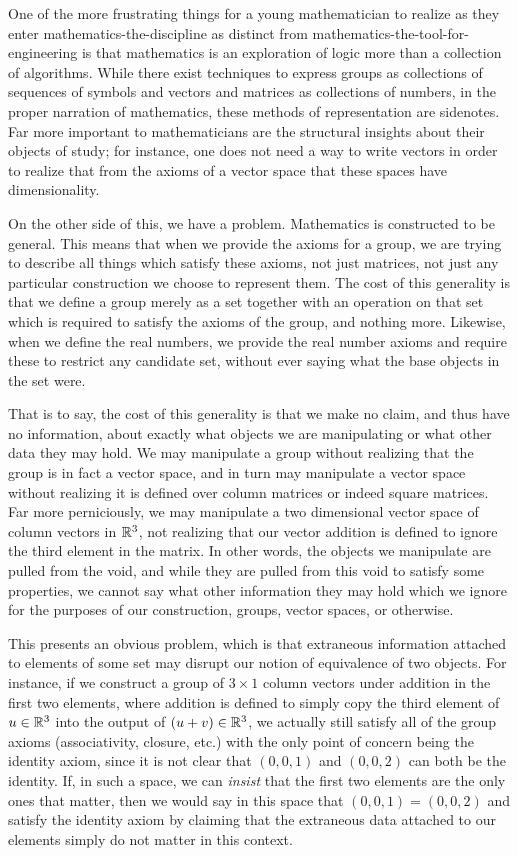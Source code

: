 \documentclass[11pt]{article}
\begin{document}
One of the more frustrating things for a young mathematician to realize as they enter mathematics-the-discipline as distinct from mathematics-the-tool-for-engineering is that mathematics is an exploration of logic more than a collection of algorithms. While there exist techniques to express groups as collections of sequences of symbols and vectors and matrices as collections of numbers, in the proper narration of mathematics, these methods of representation are sidenotes. Far more important to mathematicians are the structural insights about their objects of study; for instance, one does not need a way to write vectors in order to realize that from the axioms of a vector space that these spaces have dimensionality.

On the other side of this, we have a problem. Mathematics is constructed to be general. This means that when we provide the axioms for a group, we are trying to describe all things which satisfy these axioms, not just matrices, not just any particular construction we choose to represent them. The cost of this generality is that we define a group merely as a set together with an operation on that set which is required to satisfy the axioms of the group, and nothing more. Likewise, when we define the real numbers, we provide the real number axioms and require these to restrict any candidate set, without ever saying what the base objects in the set were.

That is to say, the cost of this generality is that we make no claim, and thus have no information, about exactly what objects we are manipulating or what other data they may hold. We may manipulate a group without realizing that the group is in fact a vector space, and in turn may manipulate a vector space without realizing it is defined over column matrices or indeed square matrices. Far more perniciously, we may manipulate a two dimensional vector space of column vectors in $\mathbb{R}^3$, not realizing that our vector addition is defined to ignore the third element in the matrix. In other words, the objects we manipulate are pulled from the void, and while they are pulled from this void to satisfy some properties, we cannot say what other information they may hold which we ignore for the purposes of our construction, groups, vector spaces, or otherwise.

This presents an obvious problem, which is that extraneous information attached to elements of some set may disrupt our notion of equivalence of two objects. For instance, if we construct a group of $3 \times 1$ column vectors under addition in the first two elements, where addition is defined to simply copy the third element of $u \in \mathbb{R}^3$ into the output of $(u + v) \in \mathbb{R}^3$, we actually still satisfy all of the group axioms (associativity, closure, etc.) with the only point of concern being the identity axiom, since it is not clear that $(0,0,1)$ and $(0,0,2)$ can both be the identity. If, in such a space, we can \emph{insist} that the first two elements are the only ones that matter, then we would say in this space that $(0,0,1) = (0,0,2)$ and satisfy the identity axiom by claiming that the extraneous data attached to our elements simply do not matter in this context.
\end{document}
